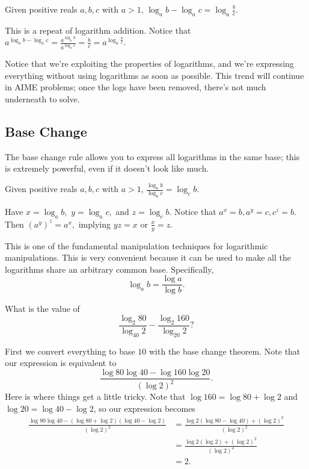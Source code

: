 \begin{theo}
Given positive reals $a,b,c$ with $a > 1$, $\log_{a}b-\log_{a}c=\log_{a}{\frac{b}{c}}.$
\end{theo}

\begin{pro}
This is a repeat of logarithm addition. Notice that $a^{\log_ab-\log_ac}=\frac{a^{\log_ab}}{ a^{\log_ac}}=\frac{b}{c}=a^{\log_a\frac{b}{c}}.$
\end{pro}

Notice that we're exploiting the properties of logarithms, and we're expressing everything without using logarithms as soon as possible. This trend will continue in AIME problems; once the logs have been removed, there's not much underneath to solve.

\subsection{Base Change}
The base change rule allows you to express all logarithms in the same base; this is extremely powerful, even if it doesn't look like much.

\begin{theo}
Given positive reals $a,b,c$ with $a > 1$, $\frac{\log_{a}b}{\log_{a}c}=\log_{c}b.$
\end{theo}

\begin{pro}
Have $x=\log_ab,$ $y=\log_ac,$ and $z=\log_cb.$ Notice that $a^x=b,a^y=c,c^z=b.$ Then $(a^y)^z=a^x,$ implying $yz=x$ or $\frac{x}{y}=z.$
\end{pro}

This is one of the fundamental manipulation techniques for logarithmic manipulations. This is very convenient because it can be used to make all the logarithms share an arbitrary common base. Specifically,
\[\log_ab=\frac{\log a}{\log b}.\]

\begin{exam}[AMC 12B 2021/9]
What is the value of \[\frac{\log_2 80}{\log_{40}2}-\frac{\log_2 160}{\log_{20}2}?\]
\end{exam}

\begin{sol}
First we convert everything to base $10$ with the base change theorem. Note that our expression is equivalent to
\[\frac{\log 80\log 40 - \log 160\log 20}{(\log 2)^2}.\]
Here is where things get a little tricky. Note that $\log 160 = \log 80 + \log 2$ and $\log 20 = \log 40 - \log 2$, so our expression becomes
\begin{align*}
\frac{\log 80\log 40 - (\log 80+\log 2)(\log 40-\log 2)}{(\log 2)^2}&=\frac{\log 2(\log 80-\log 40)+(\log 2)^2}{(\log 2)^2} \\
&=\frac{\log 2(\log 2)+(\log 2)^2}{(\log 2)^2} \\
&=2.
\end{align*}
\end{sol}

